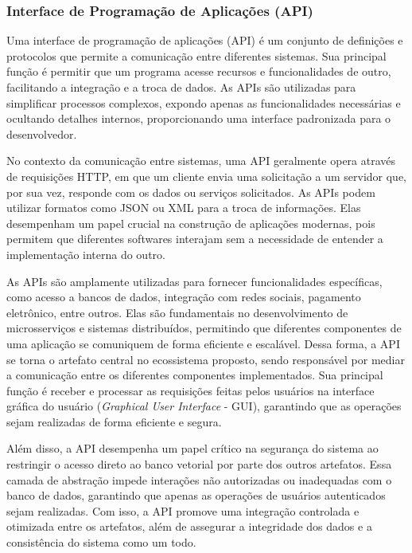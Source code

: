 \documentclass[a4paper, 12pt]{article}
\begin{document}
    \subsubsection{Interface de Programação de Aplicações (API)} \label{sec:api_concept}

    Uma interface de programação de aplicações (API) é um conjunto de definições e protocolos que permite a comunicação entre diferentes sistemas. Sua principal função é permitir que um programa acesse recursos e funcionalidades de outro, facilitando a integração e a troca de dados. As APIs são utilizadas para simplificar processos complexos, expondo apenas as funcionalidades necessárias e ocultando detalhes internos, proporcionando uma interface padronizada para o desenvolvedor.

    No contexto da comunicação entre sistemas, uma API geralmente opera através de requisições HTTP, em que um cliente envia uma solicitação a um servidor que, por sua vez, responde com os dados ou serviços solicitados. As APIs podem utilizar formatos como JSON ou XML para a troca de informações. Elas desempenham um papel crucial na construção de aplicações modernas, pois permitem que diferentes softwares interajam sem a necessidade de entender a implementação interna do outro.

    As APIs são amplamente utilizadas para fornecer funcionalidades específicas, como acesso a bancos de dados, integração com redes sociais, pagamento eletrônico, entre outros. Elas são fundamentais no desenvolvimento de microsserviços e sistemas distribuídos, permitindo que diferentes componentes de uma aplicação se comuniquem de forma eficiente e escalável. Dessa forma, a API se torna o artefato central no ecossistema proposto, sendo responsável por mediar a comunicação entre os diferentes componentes implementados. Sua principal função é receber e processar as requisições feitas pelos usuários na interface gráfica do usuário (\textit{Graphical User Interface} - GUI), garantindo que as operações sejam realizadas de forma eficiente e segura.
    
    Além disso, a API desempenha um papel crítico na segurança do sistema ao restringir o acesso direto ao banco vetorial por parte dos outros artefatos. Essa camada de abstração impede interações não autorizadas ou inadequadas com o banco de dados, garantindo que apenas as operações de usuários autenticados sejam realizadas. Com isso, a API promove uma integração controlada e otimizada entre os artefatos, além de assegurar a integridade dos dados e a consistência do sistema como um todo.
    
\end{document}
